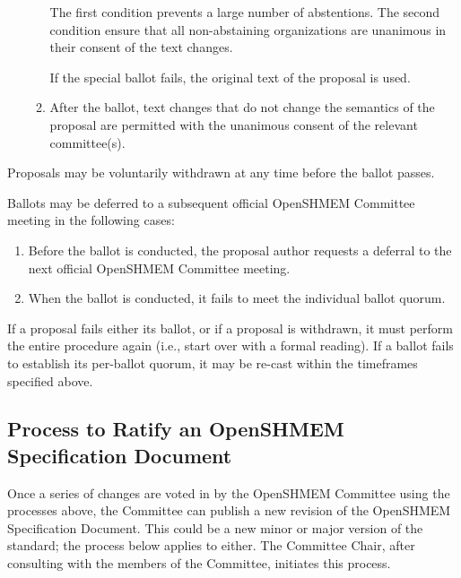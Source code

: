 \begin{enumerate}
\begin{enumerate}
    \begin{rationale}
      The first condition prevents a large number of abstentions.
      The second condition ensure that all non-abstaining
      organizations are unanimous in their consent of the text
      changes.
    \end{rationale}

    If the special ballot fails, the original text of the proposal
    is used.

  \item After the ballot, text changes that do not change the
    semantics of the proposal are permitted with the unanimous consent
    of the relevant  committee(s).
  \end{enumerate}
\end{enumerate}

Proposals may be voluntarily withdrawn at any time before the
ballot passes.

Ballots may be deferred to a subsequent official OpenSHMEM Committee meeting in
the following cases:

\begin{enumerate}
\item Before the ballot is conducted, the proposal author requests a
  deferral to the next official OpenSHMEM Committee meeting.
\item When the ballot is conducted, it fails to meet the individual
  ballot quorum.
\end{enumerate}

If a proposal fails either its ballot, or if a proposal is
withdrawn, it must perform the entire procedure again (i.e., start
over with a formal reading).  If  a ballot fails to establish its
per-ballot quorum, it may be re-cast within the timeframes specified
above.


\subsection{Process to Ratify an OpenSHMEM Specification Document}

Once a series of changes are voted in by
the OpenSHMEM Committee using the processes above, the Committee can publish a new
revision of the OpenSHMEM Specification Document.  This could be a new minor or
major version of the standard; the process below applies to either.
The Committee Chair, after consulting with the members of the Committee,
initiates this process.

